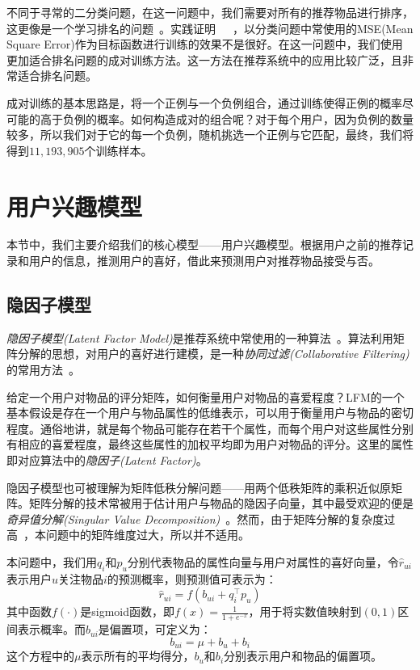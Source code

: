 \documentclass[12pt]{article} %
\newcommand\qq{\boldsymbol{\mathit{q}}}
\newcommand\pp{\boldsymbol{\mathit{p}}}
\begin{document}
\begin{sloppypar}
不同于寻常的二分类问题，在这一问题中，我们需要对所有的推荐物品进行排序，这更像是一个学习排名的问题~\cite{liu2009learning}。实践证明~\cite{furnkranz2003pairwise}~\cite{rendle2014improving}~\cite{sharma2013pairwise}，以分类问题中常使用的MSE(Mean Square Error)作为目标函数进行训练的效果不是很好。在这一问题中，我们使用更加适合排名问题的成对训练方法。这一方法在推荐系统中的应用比较广泛，且非常适合排名问题。

成对训练的基本思路是，将一个正例与一个负例组合，通过训练使得正例的概率尽可能的高于负例的概率。如何构造成对的组合呢？对于每个用户，因为负例的数量较多，所以我们对于它的每一个负例，随机挑选一个正例与它匹配，最终，我们将得到$11,193,905$个训练样本。


\section{用户兴趣模型}

本节中，我们主要介绍我们的核心模型——用户兴趣模型。根据用户之前的推荐记录和用户的信息，推测用户的喜好，借此来预测用户对推荐物品接受与否。

\subsection{隐因子模型}

{\em 隐因子模型(Latent Factor Model)}是推荐系统中常使用的一种算法~\cite{koren2009matrix}。算法利用矩阵分解的思想，对用户的喜好进行建模，是一种{\em 协同过滤(Collaborative Filtering)}的常用方法~\cite{shen2012learning}。

给定一个用户对物品的评分矩阵，如何衡量用户对物品的喜爱程度？LFM的一个基本假设是存在一个用户与物品属性的低维表示，可以用于衡量用户与物品的密切程度。通俗地讲，就是每个物品可能存在若干个属性，而每个用户对这些属性分别有相应的喜爱程度，最终这些属性的加权平均即为用户对物品的评分。这里的属性即对应算法中的{\em 隐因子(Latent Factor)}。

隐因子模型也可被理解为矩阵低秩分解问题——用两个低秩矩阵的乘积近似原矩阵。矩阵分解的技术常被用于估计用户与物品的隐因子向量，其中最受欢迎的便是{\em 奇异值分解(Singular Value Decomposition)}~\cite{kleibergen2006generalized}。然而，由于矩阵分解的复杂度过高~\cite{klema1980singular}，本问题中的矩阵维度过大，所以并不适用。

本问题中，我们用$\qq_i$和$\pp_u$分别代表物品的属性向量与用户对属性的喜好向量，令$\hat{r}_{ui}$表示用户$u$关注物品$i$的预测概率，则预测值可表示为：
\begin{equation}
	\hat{r}_{ui} = f(b_{ui} + \qq_i^\top \pp_u)
\end{equation}
其中函数$f(\cdot)$是sigmoid函数，即$f(x) = \frac{1}{1 + e^{-x}}$，用于将实数值映射到$(0,1)$区间表示概率。而$b_{ui}$是偏置项，可定义为：
\begin{equation}
	b_{ui} = \mu + b_u + b_i
\end{equation}
这个方程中的$\mu$表示所有的平均得分，$b_u$和$b_i$分别表示用户和物品的偏置项。


\end{sloppypar}
\end{document}

